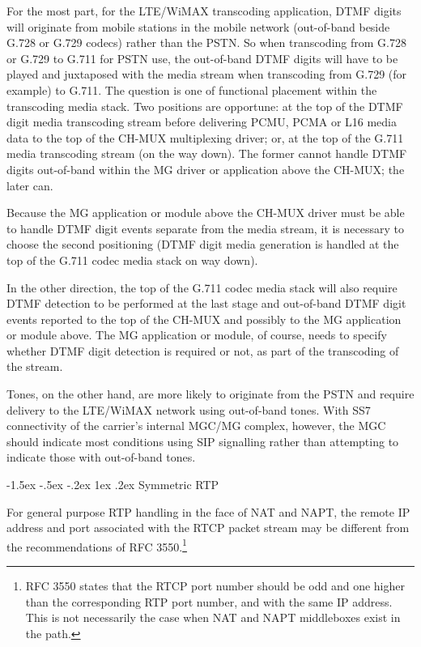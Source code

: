 \documentclass[letterpaper,final,notitlepage,twocolumn,10pt,twoside]{article}
\makeatletter
\let\normalsize = \small
\let\small = \footnotesize
\let\footnotesize = \scriptsize
\let\scriptsize = \tiny
\renewcommand\subsection{\@startsection{subsection}{2}{\z@}%
                                     {-1.5ex \@plus -.5ex \@minus -.2ex}%
                                     {1ex \@plus .2ex}%
                                     {\normalfont\normalsize\bfseries}}
\makeatother
\begin{document}
For the most part, for the LTE/WiMAX transcoding application, DTMF digits will
originate from mobile stations in the mobile network (out-of-band beside G.728
or G.729 codecs) rather than the PSTN.  So when transcoding from G.728 or G.729
to G.711 for PSTN  use, the out-of-band DTMF digits will have to be played and
juxtaposed with the media stream when transcoding from G.729 (for example) to
G.711.  The question is one of functional placement within the transcoding media
stack.  Two positions are opportune: at the top of the DTMF digit media
transcoding stream before delivering PCMU, PCMA or L16 media data to the top of
the CH-MUX multiplexing driver; or, at the top of the G.711 media transcoding
stream (on the way down).  The former cannot handle DTMF digits out-of-band
within the MG driver or application above the CH-MUX; the later can.

Because the MG application or module above the CH-MUX driver must be able to
handle DTMF digit events separate from the media stream, it is necessary to
choose the second positioning (DTMF digit media generation is handled at the top
of the G.711 codec media stack on way down).

In the other direction, the top of the G.711 codec media stack will also require
DTMF detection to be performed at the last stage and out-of-band DTMF digit
events reported to the top of the CH-MUX and possibly to the MG application or
module above.  The MG application or module, of course, needs to specify whether
DTMF digit detection is required or not, as part of the transcoding of the
stream.

Tones, on the other hand, are more likely to originate from the PSTN and require
delivery to the LTE/WiMAX network using out-of-band tones.  With SS7
connectivity of the carrier's internal MGC/MG complex, however, the MGC should
indicate most conditions using SIP signalling rather than attempting to indicate
those with out-of-band tones.

\subsection{Symmetric RTP}
\label{section:symrtp}

For general purpose RTP handling in the face of NAT and NAPT, the remote IP
address and port associated with the RTCP packet stream may be different from
the recommendations of RFC
3550.\footnote{RFC 3550 states that the RTCP port number should be odd and one
higher than the corresponding RTP port number, and with the same IP address.
This is not necessarily the case when NAT and NAPT middleboxes exist in the
path.}
\end{document}

